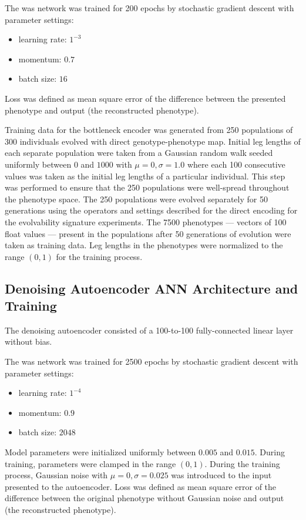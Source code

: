 The was network was trained for 200 epochs by stochastic gradient descent with parameter settings:
\begin{itemize}
  \item learning rate: $1^{-3}$
  \item momentum: $0.7$
  \item batch size: $16$
\end{itemize}
Loss was defined as mean square error of the difference between the presented phenotype and output (the reconstructed phenotype).

Training data for the bottleneck encoder was generated from 250 populations of 300 individuals evolved with direct genotype-phenotype map.
Initial leg lengths of each separate population were taken from a Gaussian random walk seeded uniformly between $0$ and $1000$ with $\mu = 0, \sigma = 1.0$ where each 100 consecutive values was taken as the initial leg lengths of a particular individual.
This step was performed to ensure that the 250 populations were well-spread throughout the phenotype space.
The 250 populations were evolved separately for 50 generations using the operators and settings described for the direct encoding for the evolvability signature experiments.
The 7500 phenotypes --- vectors of 100 float values --- present in the populations after 50 generations of evolution were taken as training data.
Leg lengths in the phenotypes were normalized to the range $(0,1)$ for the training process.

\subsection{Denoising Autoencoder ANN Architecture and Training}

The denoising autoencoder consisted of a 100-to-100 fully-connected linear layer without bias.

The was network was trained for 2500 epochs by stochastic gradient descent with parameter settings:
\begin{itemize}
  \item learning rate: $1^{-4}$
  \item momentum: $0.9$
  \item batch size: $2048$
\end{itemize}
Model parameters were initialized uniformly between $0.005$ and $0.015$.
During training, parameters were clamped in the range $(0,1)$.
During the training process, Gaussian noise with $\mu = 0, \sigma = 0.025$ was introduced to the input presented to the autoencoder.
Loss was defined as mean square error of the difference between the original phenotype without Gaussian noise and output (the reconstructed phenotype).

